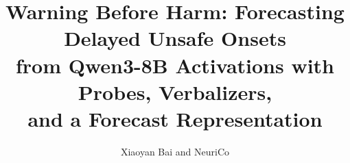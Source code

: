 \documentclass{article}
\title{Warning Before Harm: Forecasting Delayed Unsafe Onsets\\from Qwen3-8B Activations with Probes, Verbalizers,\\and a Forecast Representation}
\author{Xiaoyan Bai and NeuriCo}
\begin{document}
\maketitle

\begin{abstract}

\end{abstract}










\appendix

\end{document}
